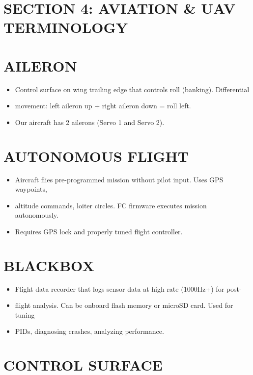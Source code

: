 \documentclass[11pt,letterpaper]{article}
\begin{document}
\section{SECTION 4: AVIATION \& UAV TERMINOLOGY}

\section{AILERON}

\begin{itemize}
  \item Control surface on wing trailing edge that controls roll (banking). Differential
  \item movement: left aileron up + right aileron down = roll left.
  \item Our aircraft has 2 ailerons (Servo 1 and Servo 2).
\end{itemize}

\section{AUTONOMOUS FLIGHT}

\begin{itemize}
  \item Aircraft flies pre-programmed mission without pilot input. Uses GPS waypoints,
  \item altitude commands, loiter circles. FC firmware executes mission autonomously.
  \item Requires GPS lock and properly tuned flight controller.
\end{itemize}

\section{BLACKBOX}

\begin{itemize}
  \item Flight data recorder that logs sensor data at high rate (1000Hz+) for post-
  \item flight analysis. Can be onboard flash memory or microSD card. Used for tuning
  \item PIDs, diagnosing crashes, analyzing performance.
\end{itemize}

\section{CONTROL SURFACE}
\end{document}
